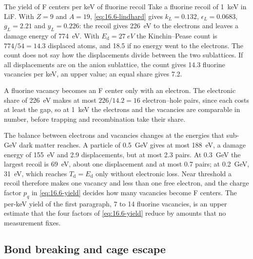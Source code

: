 \begin{workedexample}{The yield of F centers per keV of fluorine recoil}\label{we:16-fyield}
Take a fluorine recoil of \SI{1}{keV} in LiF. With $Z = 9$ and $A = 19$, \cref{eq:16.6-lindhard} gives $k_L = 0.132$, $\epsilon_L = 0.0683$, $g_L = 2.21$ and $y_L = 0.226$: the recoil gives \SI{226}{eV} to the electrons and leaves a damage energy of \SI{774}{eV}. With $E_{\mathrm{d}} = \SI{27}{eV}$ the Kinchin--Pease count is $774/54 = 14.3$ displaced atoms, and 18.5 if no energy went to the electrons. The count does not say how the displacements divide between the two sublattices. If all displacements are on the anion sublattice, the count gives 14.3 fluorine vacancies per keV, an upper value; an equal share gives 7.2.

A fluorine vacancy becomes an F center only with an electron. The electronic share of \SI{226}{eV} makes at most $226/14.2 = 16$ electron--hole pairs, since each costs at least the gap, so at \SI{1}{keV} the electrons and the vacancies are comparable in number, before trapping and recombination take their share.

The balance between electrons and vacancies changes at the energies that sub-GeV dark matter reaches. A particle of \SI{0.5}{GeV} gives at most \SI{188}{eV}, a damage energy of \SI{155}{eV} and 2.9 displacements, but at most 2.3 pairs. At \SI{0.3}{GeV} the largest recoil is \SI{69}{eV}, about one displacement and at most 0.7 pairs; at \SI{0.2}{GeV}, \SI{31}{eV}, which reaches $T_{\mathrm{d}} = E_{\mathrm{d}}$ only without electronic loss. Near threshold a recoil therefore makes one vacancy and less than one free electron, and the charge factor $p_q$ in \cref{eq:16.6-yield} decides how many vacancies become F centers. The per-keV yield of the first paragraph, 7 to 14 fluorine vacancies, is an upper estimate that the four factors of \cref{eq:16.6-yield} reduce by amounts that no measurement fixes.
\end{workedexample}

\subsection{Bond breaking and cage escape}\label{sec:16.6-bond}

